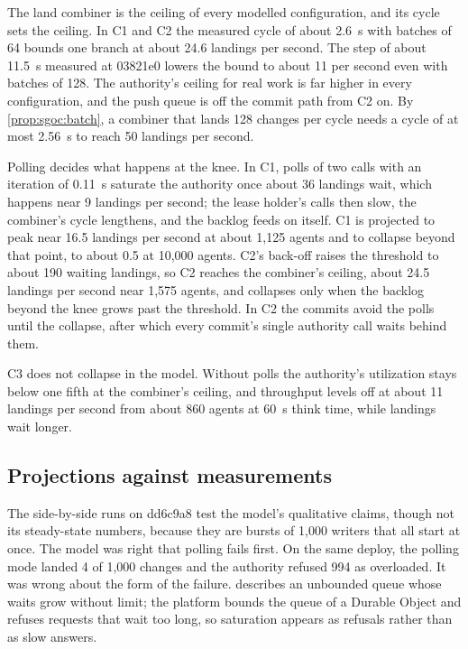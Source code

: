\documentclass[11pt,letterpaper]{article}
\theoremstyle{definition}
\theoremstyle{remark}
\begin{document}
The land combiner is the ceiling of every modelled configuration, and its cycle sets the ceiling. In C1 and C2 the measured cycle of about 2.6~s with batches of 64 bounds one branch at about 24.6 landings per second. The step of about 11.5~s measured at 03821e0 lowers the bound to about 11 per second even with batches of 128. The authority's ceiling for real work is far higher in every configuration, and the push queue is off the commit path from C2 on. By \cref{prop:sgoc:batch}, a combiner that lands 128 changes per cycle needs a cycle of at most 2.56~s to reach 50 landings per second.

Polling decides what happens at the knee. In C1, polls of two calls with an iteration of 0.11~s saturate the authority once about 36 landings wait, which happens near 9 landings per second; the lease holder's calls then slow, the combiner's cycle lengthens, and the backlog feeds on itself. C1 is projected to peak near 16.5 landings per second at about 1,125 agents and to collapse beyond that point, to about 0.5 at 10,000 agents. C2's back-off raises the threshold to about 190 waiting landings, so C2 reaches the combiner's ceiling, about 24.5 landings per second near 1,575 agents, and collapses only when the backlog beyond the knee grows past the threshold. In C2 the commits avoid the polls until the collapse, after which every commit's single authority call waits behind them.

C3 does not collapse in the model. Without polls the authority's utilization stays below one fifth at the combiner's ceiling, and throughput levels off at about 11 landings per second from about 860 agents at 60~s think time, while landings wait longer.

\subsection{Projections against measurements}
\label{sec:sgoc:projected-vs-measured}

The side-by-side runs on dd6c9a8 test the model's qualitative claims, though not its steady-state numbers, because they are bursts of 1,000 writers that all start at once. The model was right that polling fails first. On the same deploy, the polling mode landed 4 of 1,000 changes and the authority refused 994 as overloaded. %
It was wrong about the form of the failure.  describes an unbounded queue whose waits grow without limit; the platform bounds the queue of a Durable Object and refuses requests that wait too long, so saturation appears as refusals rather than as slow answers.
\end{document}
